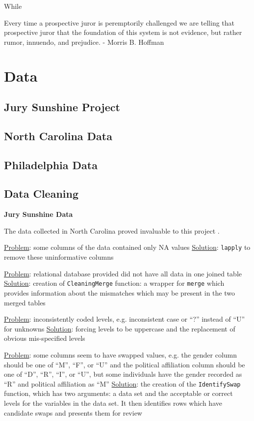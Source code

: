 \documentclass{article}
\begin{document}
While

Every time a prospective juror is peremptorily challenged we are telling that prospective juror that the foundation of this system
is not evidence, but rather rumor, innuendo, and prejudice. - Morris B. Hoffman \cite{hoffman1997}

\section{Data} \label{sec:data}

\subsection{Jury Sunshine Project} \label{subsec:jspdata}

\subsection{North Carolina Data} \label{subsec:norcardata}

\subsection{Philadelphia Data} \label{subsec:phillydata}

\subsection{Data Cleaning} \label{subsec:datacleaning}

\textbf{Jury Sunshine Data}

The data collected in North Carolina proved invaluable to this project \cite{JurySunshineProj}.

\underline{Problem}: some columns of the data contained only NA values
\underline{Solution}: \texttt{lapply} to remove these uninformative columns

\underline{Problem}: relational database provided did not have all data in one joined table
\underline{Solution}: creation of \texttt{CleaningMerge} function: a wrapper for \texttt{merge} which provides information about the
mismatches which may be present in the two merged tables

\underline{Problem}: inconsistently coded levels, e.g. inconsistent case or ``?'' instead of ``U'' for unknowns
\underline{Solution}: forcing levels to be uppercase and the replacement of obvious mis-specified levels

\underline{Problem}: some columns seem to have swapped values, e.g. the gender column should be one of ``M'', ``F'', or ``U'' and the
political affiliation column should be one of ``D'', ``R'', ``I'', or ``U'', but some individuals have the gender recorded as
``R'' and political affiliation as ``M''
\underline{Solution}: the creation of the \texttt{IdentifySwap} function, which has two arguments: a data set and the acceptable or correct
levels for the variables in the data set. It then identifies rows which have candidate swaps and presents them for review
\end{document}
